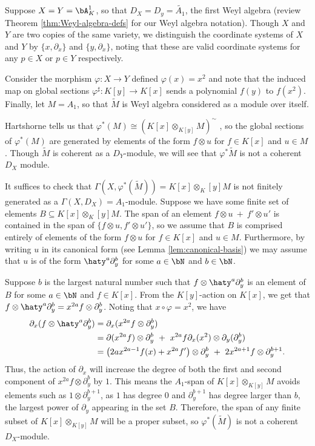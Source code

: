 \begin{example}\label{example:badly-behaved-inv-img}
	Suppose $X = Y = \bA^1_K$, so that $D_X = D_y = \tilde{A_1}$, the first Weyl algebra (review Theorem \ref{thm:Weyl-algebra-defs} for our Weyl algebra notation). Though $X$ and $Y$ are two copies of the same variety, we distinguish the coordinate systems of $X$ and $Y$ by $\{x,\partial_x\}$ and $\{y,\partial_x\}$, noting that these are valid coordinate systems for any $p\in X$ or $p \in Y$ respectively. 
	
	Consider the morphism $\varphi:X\to Y$ defined $\varphi(x) = x^2$ and note that the induced map on global sections $\varphi^\sharp:K[y]\to K[x]$ sends a polynomial $f(y)$ to $f(x^2)$. Finally, let $M = A_1$, so that $\tilde{M}$ is Weyl algebra considered as a module over itself.

	Hartshorne tells us that $\varphi^*(M) \cong (K[x] \otimes_{K[y]} M)^\sim$ \cite[Proposition 5.2]{hartshorne}, so the global sections of $\varphi^*(M)$ are generated by elements of the form $f\otimes u$ for $f \in K[x]$ and $u \in M$. Though $\tilde{M}$ is coherent as a $D_Y$-module, we will see that $\varphi^*\tilde{M}$ is not a coherent $D_X$ module.

	It suffices to check that $\Gamma(X,\varphi^*(\tilde{M})) = K[x]\otimes_K[y] M$ is not finitely generated as a $\Gamma(X,D_X) = A_1$-module. Suppose we have some finite set of elements $B \subseteq K[x]\otimes_K[y] M$. The span of an element $f\otimes u ~+~ f'\otimes u'$ is contained in the span of $\{f\otimes u,f'\otimes u'\}$, so we assume that $B$ is comprised entirely of elements of the form $f\otimes u$ for $f \in K[x]$ and $u \in M$. Furthermore, by writing $u$ in its canonical form (see Lemma \ref{lem:canonical-basis}) we may assume that $u$ is of the form $\haty^a\partial_y^b$ for some $a\in \bN$ and $b \in \bN$.

	Suppose $b$ is the largest natural number such that $f\otimes \haty^a\partial_y^b$ is an element of $B$ for some $a\in \bN$ and $f \in K[x]$. From the $K[y]$-action on $K[x]$, we get that $f\otimes \haty^a\partial_y^b = x^{2a}f\otimes \partial_y^b$. Noting that $x\circ \varphi = x^2$, we have
	\begin{align*}
		\partial_x(f\otimes \haty^a\partial_y^b)
		  &= \partial_x(x^{2a}f\otimes \partial_y^b) \\
		  &= \partial(x^{2a}f) \otimes \partial_y^b ~+~ x^{2a}f\partial_x(x^2)\otimes \partial_y(\partial_y^b)\\
		  &= \left(2ax^{2a-1}f(x) + x^{2a}f'\right)\otimes \partial_y^{b} ~+~ 2x^{2a+1}f\otimes \partial_y^{b+1}.
	\end{align*}
	Thus, the action of $\partial_x$ will increase the degree of both the first and second component of $x^{2a}f\otimes \partial_y^b$ by $1$. This means the $A_1$-span of $K[x]\otimes_{K[y]} M$ avoids elements such as $1\otimes \partial_y^{b+1}$, as $1$ has degree 0 and $\partial_y^{b+1}$ has degree larger than $b$, the largest power of $\partial_y$ appearing in the set $B$. Therefore, the span of any finite subset of $K[x]\otimes_{K[y]}M$ will be a proper subset, so $\varphi^*(\tilde{M})$ is not a coherent $D_X$-module.
\end{example}




